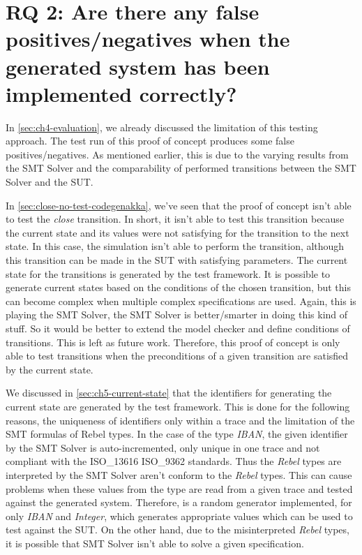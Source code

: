 \section{RQ 2: Are there any false positives/negatives when the generated system has been implemented correctly?}

In \autoref{sec:ch4-evaluation}, we already discussed the limitation of this testing approach. The test run of this proof of concept produces some false positives/negatives. As mentioned earlier, this is due to the varying results from the SMT Solver and the comparability of performed transitions between the SMT Solver and the SUT.


In \autoref{sec:close-no-test-codegenakka}, we've seen that the proof of concept isn't able to test the \textit{close} transition. In short, it isn't able to test this transition because the current state and its values were not satisfying for the transition to the next state. In this case, the simulation isn't able to perform the transition, although this transition can be made in the SUT with satisfying parameters. The current state for the transitions is generated by the test framework. It is possible to generate current states based on the conditions of the chosen transition, but this can become complex when multiple complex specifications are used. Again, this is playing the SMT Solver, the SMT Solver is better/smarter in doing this kind of stuff. So it would be better to extend the model checker and define conditions of transitions. This is left as future work. Therefore, this proof of concept is only able to test transitions when the preconditions of a given transition are satisfied by the current state.


We discussed in \autoref{sec:ch5-current-state} that the identifiers for generating the current state are generated by the test framework. This is done for the following reasons, the uniqueness of identifiers only within a trace and the limitation of the SMT formulas of Rebel types. In the case of the type \textit{IBAN}, the given identifier by the SMT Solver is auto-incremented, only unique in one trace and not compliant with the ISO\_13616 ISO\_9362 standards. Thus the \textit{Rebel} types are interpreted by the SMT Solver aren't conform to the \textit{Rebel} types. This can cause problems when these values from the type are read from a given trace and tested against the generated system. Therefore, is a random generator implemented, for only \textit{IBAN} and \textit{Integer}, which generates appropriate values which can be used to test against the SUT. On the other hand, due to the misinterpreted \textit{Rebel} types, it is possible that SMT Solver isn't able to solve a given specification.

